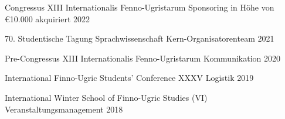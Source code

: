 
\begin{cvhonors}
    \cvhonor
    {Congressus XIII Internationalis Fenno-Ugristarum} %
    {Sponsoring in Höhe von €10.000 akquiriert} %
    {} %
    {2022} %

    \cvhonor
    {70. Studentische Tagung Sprachwissenschaft} %
    {Kern-Organisatorenteam} %
    {} %
    {2021} %

    \cvhonor
    {Pre-Congressus XIII Internationalis Fenno-Ugristarum} %
    {Kommunikation} %
    {} %
    {2020} %

    \cvhonor
    {International Finno-Ugric Students' Conference XXXV} %
    {Logistik} %
    {} %
    {2019} %

    \cvhonor
    {International Winter School of Finno-Ugric Studies (VI)} %
    {Veranstaltungsmanagement} %
    {} %
    {2018} %
\end{cvhonors}
